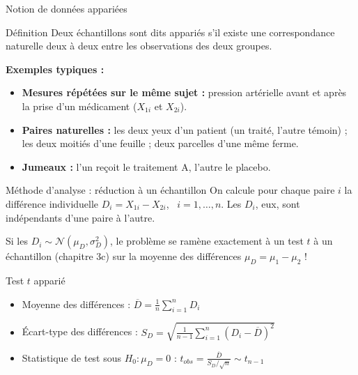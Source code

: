 \documentclass{BeamerTemplate}
\begin{document}
\begin{frame}[t]{Notion de données appariées}
  \begin{Boite}{Définition}
    Deux échantillons sont dits \alert{appariés} s'il existe une correspondance naturelle deux à deux entre les observations des deux groupes.
  \end{Boite}

  \textbf{Exemples typiques :}
  \begin{itemize}\itemsep 1.5mm
    \item \textbf{Mesures répétées sur le même sujet :} pression artérielle avant et après la prise d'un médicament ($X_{1i}$ et $X_{2i}$).
    \item \textbf{Paires naturelles :} les deux yeux d'un patient (un traité, l'autre témoin) ; les deux moitiés d'une feuille ; deux parcelles d'une même ferme.
    \item \textbf{Jumeaux :} l'un reçoit le traitement A, l'autre le placebo.
  \end{itemize}

  \medskip
\end{frame}

\begin{frame}[t]{Méthode d'analyse : réduction à un échantillon}
  On calcule pour chaque paire $i$ la \alert{différence individuelle}
  $D_i = X_{1i} - X_{2i}$, \ $i = 1, \ldots, n$.
  Les $D_i$, eux, sont \alert{indépendants} d'une paire à l'autre.

  \smallskip
  Si les $D_i \sim \mathcal{N}(\mu_D, \sigma_D^2)$, le problème se ramène exactement à un \alert{test $t$ à un échantillon} (chapitre 3c) sur la moyenne des différences $\mu_D = \mu_1 - \mu_2$ !

  \medskip
  \begin{Boite}{Test $t$ apparié}
    \begin{itemize}\itemsep 1mm
      \item Moyenne des différences : $\overline{D} = \frac{1}{n}\sum_{i=1}^n D_i$
      \item Écart-type des différences : $S_D = \sqrt{\frac{1}{n-1}\sum_{i=1}^n (D_i - \overline{D})^2}$
      \item Statistique de test sous $H_0: \mu_D = 0$ :
        $\displaystyle t_{obs} = \frac{\overline{D}}{S_D / \sqrt{n}} \sim t_{n-1}$
    \end{itemize}
  \end{Boite}
\end{frame}
\end{document}
